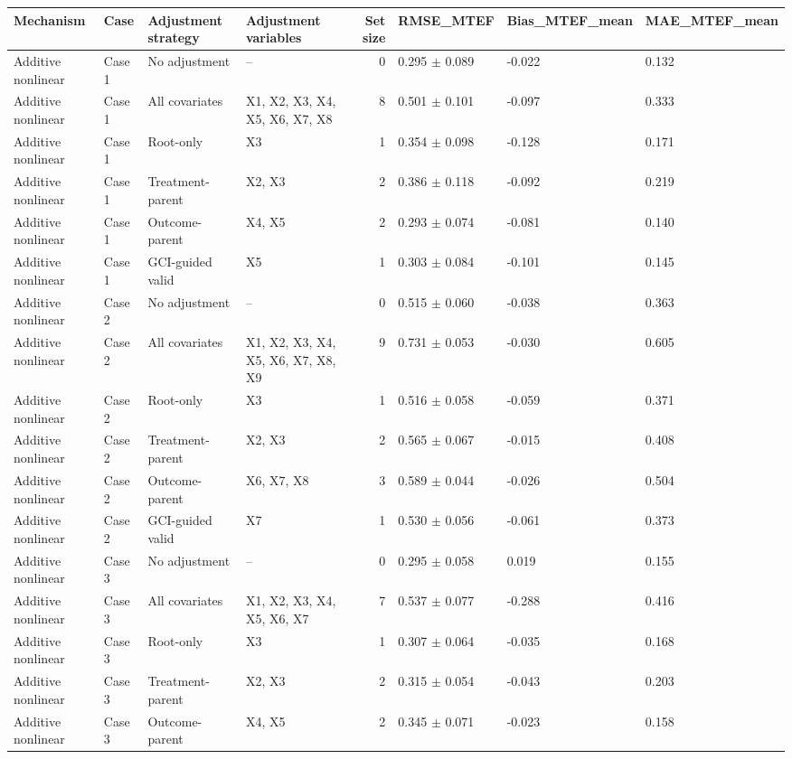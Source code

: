 \begin{tabular}{llllrlll}
\toprule
Mechanism & Case & Adjustment strategy & Adjustment variables & Set size & RMSE_MTEF & Bias_MTEF_mean & MAE_MTEF_mean \\
\midrule
Additive nonlinear & Case 1 & No adjustment & -- & 0 & 0.295 $\pm$ 0.089 & -0.022 & 0.132 \\
Additive nonlinear & Case 1 & All covariates & X1, X2, X3, X4, X5, X6, X7, X8 & 8 & 0.501 $\pm$ 0.101 & -0.097 & 0.333 \\
Additive nonlinear & Case 1 & Root-only & X3 & 1 & 0.354 $\pm$ 0.098 & -0.128 & 0.171 \\
Additive nonlinear & Case 1 & Treatment-parent & X2, X3 & 2 & 0.386 $\pm$ 0.118 & -0.092 & 0.219 \\
Additive nonlinear & Case 1 & Outcome-parent & X4, X5 & 2 & 0.293 $\pm$ 0.074 & -0.081 & 0.140 \\
Additive nonlinear & Case 1 & GCI-guided valid & X5 & 1 & 0.303 $\pm$ 0.084 & -0.101 & 0.145 \\
Additive nonlinear & Case 2 & No adjustment & -- & 0 & 0.515 $\pm$ 0.060 & -0.038 & 0.363 \\
Additive nonlinear & Case 2 & All covariates & X1, X2, X3, X4, X5, X6, X7, X8, X9 & 9 & 0.731 $\pm$ 0.053 & -0.030 & 0.605 \\
Additive nonlinear & Case 2 & Root-only & X3 & 1 & 0.516 $\pm$ 0.058 & -0.059 & 0.371 \\
Additive nonlinear & Case 2 & Treatment-parent & X2, X3 & 2 & 0.565 $\pm$ 0.067 & -0.015 & 0.408 \\
Additive nonlinear & Case 2 & Outcome-parent & X6, X7, X8 & 3 & 0.589 $\pm$ 0.044 & -0.026 & 0.504 \\
Additive nonlinear & Case 2 & GCI-guided valid & X7 & 1 & 0.530 $\pm$ 0.056 & -0.061 & 0.373 \\
Additive nonlinear & Case 3 & No adjustment & -- & 0 & 0.295 $\pm$ 0.058 & 0.019 & 0.155 \\
Additive nonlinear & Case 3 & All covariates & X1, X2, X3, X4, X5, X6, X7 & 7 & 0.537 $\pm$ 0.077 & -0.288 & 0.416 \\
Additive nonlinear & Case 3 & Root-only & X3 & 1 & 0.307 $\pm$ 0.064 & -0.035 & 0.168 \\
Additive nonlinear & Case 3 & Treatment-parent & X2, X3 & 2 & 0.315 $\pm$ 0.054 & -0.043 & 0.203 \\
Additive nonlinear & Case 3 & Outcome-parent & X4, X5 & 2 & 0.345 $\pm$ 0.071 & -0.023 & 0.158 \\

\end{tabular}
